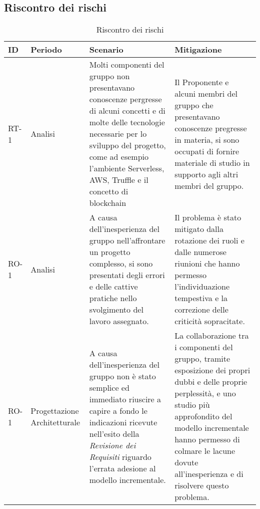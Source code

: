 \begin{appendices}
\section{Riscontro dei rischi}
	\begin{longtable}{
		>{\centering}p{}
		>{\centering}p{}
		>{\centering\arraybackslash}p{}
		>{\centering\arraybackslash}p{} }

		\caption {Riscontro dei rischi} \\

		\textbf{\color{white}ID} &
		\textbf{\color{white}Periodo} &
		\textbf{\color{white}Scenario} &
		\textbf{\color{white}Mitigazione}
		\tabularnewline
		\endhead

		RT-1
		&
		Analisi
		&
		Molti componenti del gruppo \Gruppo{} non presentavano conoscenze pergresse di alcuni concetti e di molte delle tecnologie necessarie per lo sviluppo del progetto, come ad esempio l'ambiente\ped{\textit{G}} Serverless\ped{\textit{G}}, AWS\ped{\textit{G}}, Truffle\ped{\textit{G}} e il concetto di blockchain\ped{\textit{G}}
		&
		Il Proponente\ped{\textit{G}} e alcuni membri del gruppo che presentavano conoscenze pregresse in materia, si sono occupati di fornire materiale di studio in supporto agli altri membri del gruppo.\\

		RO-1
		&
		Analisi
		&
		A causa dell'inesperienza del gruppo nell'affrontare un progetto complesso, si sono presentati degli errori e delle cattive pratiche nello svolgimento del lavoro assegnato.
		&
		Il problema è stato mitigato dalla rotazione dei ruoli e dalle numerose riunioni che hanno permesso l'individuazione tempestiva e la correzione delle criticità sopracitate.\\

		RO-1
		&
		Progettazione Architetturale
		&
		A causa dell'inesperienza del gruppo non è stato semplice ed immediato riuscire a capire a fondo le indicazioni ricevute nell'esito della \textit{Revisione dei Requisiti} riguardo l'errata adesione al modello incrementale.
		&
		La collaborazione tra i componenti del gruppo, tramite esposizione dei propri dubbi e delle proprie perplessità, e uno studio più approfondito del modello incrementale hanno permesso di colmare le lacune dovute all'inesperienza e di risolvere questo problema.\\


\end{longtable}
\end{appendices}
